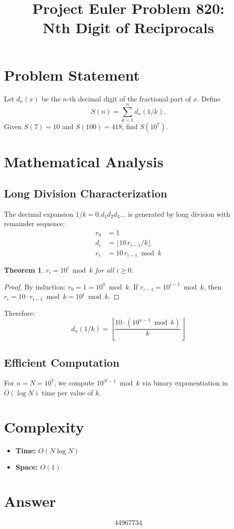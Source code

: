 \documentclass[12pt]{article}
\title{Project Euler Problem 820:\\Nth Digit of Reciprocals}
\author{}
\date{}
\newtheorem{theorem}{Theorem}
\theoremstyle{definition}
\begin{document}
\maketitle

\section{Problem Statement}
Let $d_n(x)$ be the $n$-th decimal digit of the fractional part of $x$. Define
\[
S(n) = \sum_{k=1}^{n} d_n(1/k).
\]
Given $S(7) = 10$ and $S(100) = 418$, find $S(10^7)$.

\section{Mathematical Analysis}

\subsection{Long Division Characterization}
The decimal expansion $1/k = 0.d_1 d_2 d_3 \ldots$ is generated by long division with remainder sequence:
\begin{align}
r_0 &= 1 \\
d_i &= \lfloor 10\, r_{i-1} / k \rfloor \\
r_i &= 10\, r_{i-1} \bmod k
\end{align}

\begin{theorem}
$r_i = 10^i \bmod k$ for all $i \geq 0$.
\end{theorem}
\begin{proof}
By induction: $r_0 = 1 = 10^0 \bmod k$. If $r_{i-1} = 10^{i-1} \bmod k$, then $r_i = 10 \cdot r_{i-1} \bmod k = 10^i \bmod k$.
\end{proof}

Therefore:
\[
d_n(1/k) = \left\lfloor \frac{10 \cdot (10^{n-1} \bmod k)}{k} \right\rfloor
\]

\subsection{Efficient Computation}
For $n = N = 10^7$, we compute $10^{N-1} \bmod k$ via binary exponentiation in $O(\log N)$ time per value of $k$.

\section{Complexity}
\begin{itemize}
    \item \textbf{Time:} $O(N \log N)$
    \item \textbf{Space:} $O(1)$
\end{itemize}

\section{Answer}

\[
\boxed{44967734}
\]
\end{document}
